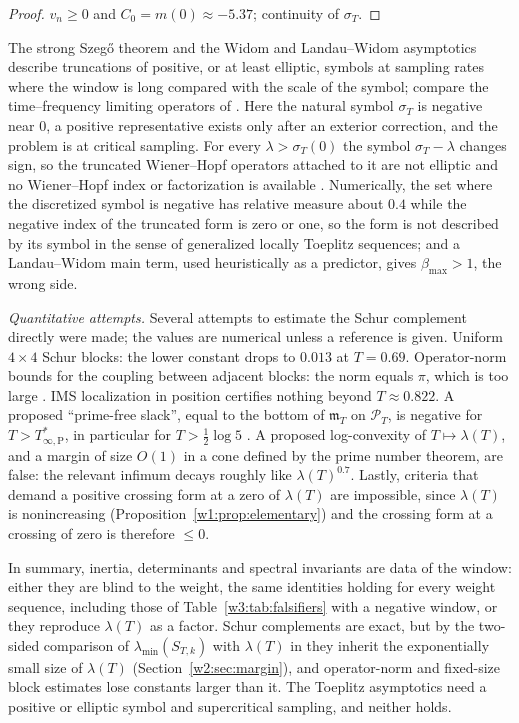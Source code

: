 \documentclass[11pt]{amsart}
\theoremstyle{definition}
\theoremstyle{remark}
\numberwithin{equation}{section}
\newcommand{\PT}{\mathcal{P}_T}                        %
\newcommand{\mT}{\mathfrak{m}_T}                       %
\newcommand{\sT}{\sigma_T}                             %
\newcommand{\lam}{\lambda(T)}                          %
\newcommand{\Tarch}{T^{*}_{\infty,\mathrm P}}          %
\begin{document}
\begin{proof}
$v_n\ge0$ and $C_0=m(0)\approx-5.37$; continuity of $\sT$.
\end{proof}

The strong Szeg\H{o} theorem and the Widom and Landau--Widom asymptotics \cite{LandauWidom1980,BottcherSilbermann2006}
describe truncations of positive, or at least elliptic, symbols at sampling rates where the window is long compared
with the scale of the symbol; compare the time--frequency limiting operators of \cite{SlepianPollak1961}. Here the
natural symbol $\sT$ is negative near $0$, a positive representative exists only after an exterior correction, and the
problem is at critical sampling. For every $\lambda>\sT(0)$ the symbol $\sT-\lambda$ changes sign, so the truncated
Wiener--Hopf operators attached to it are not elliptic and no Wiener--Hopf index or factorization is available
\cite[Theorem~4.7]{P46}. Numerically, the set where the discretized symbol is negative has relative measure about
$0.4$ while the negative index of the truncated form is zero or one, so the form is not described by its symbol in the
sense of generalized locally Toeplitz sequences; and a Landau--Widom main term, used heuristically as a predictor,
gives $\beta_{\max}>1$, the wrong side.

\emph{Quantitative attempts.} Several attempts to estimate the Schur complement directly were made; the values are
numerical unless a reference is given. Uniform $4\times4$ Schur blocks: the lower constant drops to $0.013$ at $T=0.69$.
Operator-norm bounds for the coupling between adjacent blocks: the norm equals $\pi$, which is too large
\cite[Remark~10.16]{P46}. IMS localization in position certifies nothing beyond $T\approx0.822$. A proposed ``prime-free
slack'', equal to the bottom of $\mT$ on $\PT$, is negative for $T>\Tarch$, in particular for $T>\frac12\log5$
\cite[Proposition~7.1 and Lemma~7.5]{P46}. A proposed log-convexity of $T\mapsto\lam$, and a margin of size $O(1)$ in
a cone defined by the prime number theorem, are false: the relevant infimum decays roughly like $\lam^{0.7}$. Lastly,
criteria that demand a positive crossing form at a zero of $\lam$ are impossible, since $\lam$ is nonincreasing
(Proposition~\ref{w1:prop:elementary}) and the crossing form at a crossing of zero is therefore $\le0$.

In summary, inertia, determinants and spectral invariants are data of the window: either they are blind to the
weight, the same identities holding for every weight sequence, including those of Table~\ref{w3:tab:falsifiers} with a
negative window, or they reproduce $\lam$ as a factor. Schur complements are exact, but by the two-sided comparison of
$\lambda_{\min}(S_{T,k})$ with $\lam$ in \cite[Theorem~10.14]{P46} they inherit the exponentially small size of $\lam$
(Section~\ref{w2:sec:margin}), and operator-norm and fixed-size block estimates lose constants larger than it. The
Toeplitz asymptotics need a positive or elliptic symbol and supercritical sampling, and neither holds.
\end{document}
